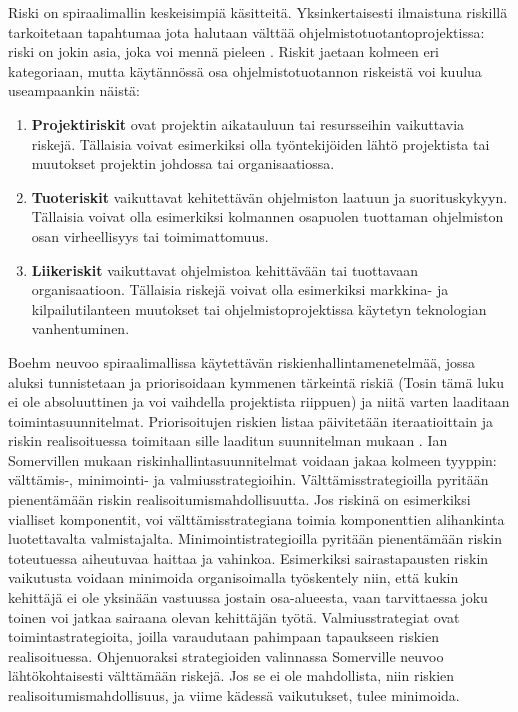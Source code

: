 \documentclass[finnish,12pt]{tktltiki2}
\theoremstyle{definition}
\theoremstyle{remark}
\begin{document}
Riski on spiraalimallin keskeisimpiä käsitteitä. Yksinkertaisesti ilmaistuna riskillä tarkoitetaan tapahtumaa jota halutaan välttää ohjelmistotuotantoprojektissa: riski on jokin asia, joka voi mennä pieleen \cite{Sommerville10}. Riskit jaetaan kolmeen eri kategoriaan, mutta käytännössä osa ohjelmistotuotannon riskeistä voi kuulua useampaankin näistä:

\begin{enumerate}
\item \textbf{Projektiriskit} ovat projektin aikatauluun tai resursseihin vaikuttavia riskejä. Tällaisia voivat esimerkiksi olla työntekijöiden lähtö projektista tai muutokset projektin johdossa tai organisaatiossa.
\item \textbf{Tuoteriskit} vaikuttavat kehitettävän ohjelmiston laatuun ja suorituskykyyn. Tällaisia voivat olla esimerkiksi kolmannen osapuolen tuottaman ohjelmiston osan virheellisyys tai toimimattomuus.
\item \textbf{Liikeriskit} vaikuttavat ohjelmistoa kehittävään tai tuottavaan organisaatioon. Tällaisia riskejä voivat olla esimerkiksi markkina- ja kilpailutilanteen muutokset tai ohjelmistoprojektissa käytetyn teknologian vanhentuminen. 
\end{enumerate}

Boehm neuvoo spiraalimallissa käytettävän riskienhallintamenetelmää, jossa aluksi tunnistetaan ja priorisoidaan kymmenen tärkeintä riskiä (Tosin tämä luku ei ole absoluuttinen ja voi vaihdella projektista riippuen) ja niitä varten laaditaan toimintasuunnitelmat. Priorisoitujen riskien listaa päivitetään iteraatioittain ja riskin realisoituessa toimitaan sille laaditun suunnitelman mukaan \cite{Boehm:1988:SMS:45797.45801}. Ian Somervillen mukaan riskinhallintasuunnitelmat voidaan jakaa kolmeen tyyppin: välttämis-, minimointi- ja valmiusstrategioihin\cite{Sommerville10}. Välttämisstrategioilla pyritään pienentämään riskin realisoitumismahdollisuutta. Jos riskinä on esimerkiksi vialliset komponentit, voi välttämisstrategiana toimia komponenttien alihankinta luotettavalta valmistajalta. Minimointistrategioilla pyritään pienentämään riskin toteutuessa aiheutuvaa haittaa ja vahinkoa. Esimerkiksi sairastapausten riskin vaikutusta voidaan minimoida organisoimalla työskentely niin, että kukin kehittäjä ei ole yksinään vastuussa jostain osa-alueesta, vaan tarvittaessa joku toinen voi jatkaa sairaana olevan kehittäjän työtä. Valmiusstrategiat ovat toimintastrategioita, joilla varaudutaan pahimpaan tapaukseen riskien realisoituessa. Ohjenuoraksi strategioiden valinnassa Somerville neuvoo lähtökohtaisesti välttämään riskejä. Jos se ei ole mahdollista, niin riskien realisoitumismahdollisuus, ja viime kädessä vaikutukset, tulee minimoida.
\end{document}
